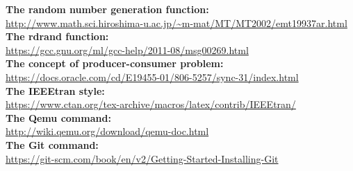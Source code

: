 \documentclass[10pt,draftclsnofoot,peerreview,letterpaper,onecolumn,]{IEEEtran}
\begin{document}
\begin{thebibliography}{1}

\textbf{The random number generation function:}\\ \color{blue}\url{http://www.math.sci.hiroshima-u.ac.jp/~m-mat/MT/MT2002/emt19937ar.html}\\
\color{black}
\textbf{The rdrand function:}\\
\color{blue}\url{https://gcc.gnu.org/ml/gcc-help/2011-08/msg00269.html}\\
\color{black}
\textbf{The concept of producer-consumer problem:}\\
\color{blue}\url{https://docs.oracle.com/cd/E19455-01/806-5257/sync-31/index.html}
\\
\color{black}
\textbf{The IEEEtran style:}\\
\color{blue}\url{https://www.ctan.org/tex-archive/macros/latex/contrib/IEEEtran/}
\\
\color{black}
\textbf{The Qemu command:}\\
\color{blue}\url{http://wiki.qemu.org/download/qemu-doc.html}
\\
\color{black}
\textbf{The Git command:}\\
\color{blue}\url{https://git-scm.com/book/en/v2/Getting-Started-Installing-Git}

\end{thebibliography}
\end{document}
